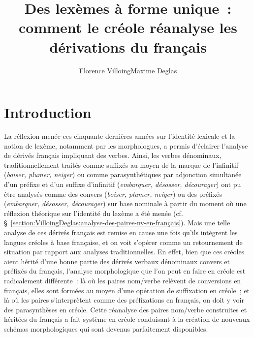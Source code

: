\documentclass[output=paper]{langsci/langscibook}
\title{Des lexèmes à forme unique~: comment le créole réanalyse les dérivations du français}
\author{Florence Villoing\affiliation{Modèles, Dynamiques, Corpus~ (MoDyCo) CNRS~: UMR7114,~Université Paris Nanterre}\lastand Maxime Deglas \affiliation{Structures Formelles du Langage~ (SFL), CNRS~:UMR7023,~Université Paris VIII - Vincennes Saint-Denis}
}
\begin{document}


\section{Introduction}\label{section:VilloingDeglas:introduction}

La réflexion menée ces cinquante dernières années sur l'identité
lexicale et la notion de lexème, notamment par les morphologues, a
permis d'éclairer l'analyse de dérivés français impliquant des verbes.
Ainsi, les verbes dénominaux, traditionnellement traités comme suffixés
au moyen de la marque de l'infinitif (\emph{boiser, plumer, neiger}) ou
comme parasynthétiques par adjonction simultanée d'un préfixe et d'un
suffixe d'infinitif (\emph{embar\-quer, désosser, décourager}) ont pu être
analysés comme des convers (\emph{boiser, plumer, neiger}) ou des
préfixés (\emph{embarquer, désosser, décourager}) sur base nominale à
partir du moment où une réflexion théorique sur l'identité du lexème a
été menée (cf. §~\ref{section:VilloingDeglas:analyse-des-paires-nv-en-français}). Mais une telle analyse de ces dérivés français est
remise en cause une fois qu'ils intègrent les langues créoles à base
française, et on voit s'opérer comme un retournement de situation par
rapport aux analyses traditionnelles. En effet, bien que ces créoles
aient hérité d'une bonne partie des dérivés verbaux dénominaux convers
et préfixés du français, l'analyse morphologique que l'on peut en faire
en créole est radicalement différente~: là où les paires nom/verbe
relèvent de conversions en français, elles sont formées au moyen d'une
opération de suffixation en créole~; et là où les paires s'interprètent
comme des préfixations en français, on doit y voir des parasynthèses en
créole. Cette réanalyse des paires nom/verbe construites et héritées du
français a fait système en créole conduisant à la création de nouveaux
schémas morphologiques qui sont devenus parfaitement disponibles.
\end{document}
